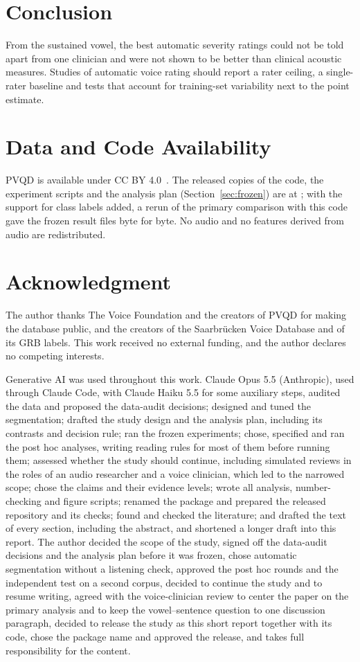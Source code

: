 \documentclass[journal]{IEEEtran}
\begin{document}
\section{Conclusion}\label{sec:conclusion}
From the sustained vowel, the best automatic severity ratings could not be told apart from one clinician and were not shown to be better than clinical acoustic measures. Studies of automatic voice rating should report a rater ceiling, a single-rater baseline and tests that account for training-set variability next to the point estimate.

\section*{Data and Code Availability}
PVQD is available under CC BY 4.0~\cite{walden2022pvqddata}. The released copies of the code, the experiment scripts and the analysis plan (Section~\ref{sec:frozen}) are at \repoUrl{}; with the support for class labels added, a rerun of the primary comparison with this code gave the frozen result files byte for byte. \oofStatement{} No audio and no features derived from audio are redistributed.

\section*{Acknowledgment}
The author thanks The Voice Foundation and the creators of PVQD for making the database public, and the creators of the Saarbr\"{u}cken Voice Database and of its GRB labels. This work received no external funding, and the author declares no competing interests.

Generative AI was used throughout this work. Claude Opus 5.5 (Anthropic), used through Claude Code, with Claude Haiku 5.5 for some auxiliary steps, audited the data and proposed the data-audit decisions; designed and tuned the segmentation; drafted the study design and the analysis plan, including its contrasts and decision rule; ran the frozen experiments; chose, specified and ran the post hoc analyses, writing reading rules for most of them before running them; assessed whether the study should continue, including simulated reviews in the roles of an audio researcher and a voice clinician, which led to the narrowed scope; chose the claims and their evidence levels; wrote all analysis, number-checking and figure scripts; renamed the package and prepared the released repository and its checks; found and checked the literature; and drafted the text of every section, including the abstract, and shortened a longer draft into this report. The author decided the scope of the study, signed off the data-audit decisions and the analysis plan before it was frozen, chose automatic segmentation without a listening check, approved the post hoc rounds and the independent test on a second corpus, decided to continue the study and to resume writing, agreed with the voice-clinician review to center the paper on the primary analysis and to keep the vowel--sentence question to one discussion paragraph, decided to release the study as this short report together with its code, chose the package name and approved the release, and takes full responsibility for the content.



\end{document}
